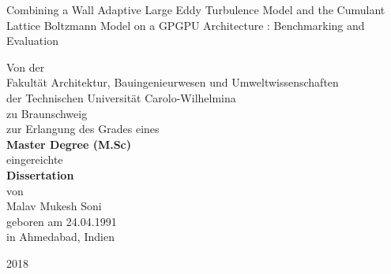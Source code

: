 %
%
\begin{titlepage}
\flushbottom
\renewcommand{\baselinestretch}{1.5} 
\sffamily
  \begin{center}		
    \begin{minipage}{1.5cm}
		\end{minipage}
		\vspace{1mm}
		\Large{Combining a Wall Adaptive Large Eddy Turbulence Model and the Cumulant Lattice Boltzmann Model on a GPGPU 	Architecture : Benchmarking and Evaluation}\\
	 	\vspace{15mm}
    \normalsize
		\begin{minipage}{2cm}
		\end{minipage}
		\begin{minipage}{14cm}
			\begin{center}
				Von der \\
				Fakultät Architektur, Bauingenieurwesen und Umweltwissenschaften \\
				der Technischen Universität Carolo-Wilhelmina \\
				zu Braunschweig \\
				\vspace{15mm}
				zur Erlangung des Grades eines \\
	      \textbf{Master Degree (M.Sc)} \\
	      eingereichte \\
	      \vspace{20mm}
				\textbf{Dissertation}\\
				\vspace{15mm}
				von \\
				Malav Mukesh Soni\\
		    geboren am 24.04.1991 \\
		    in Ahmedabad, Indien \\
	    \end{center}
	  \end{minipage}
	  \vspace{8mm}
  \end{center}
	\hspace{1.4cm}
	{
	}

  \centering
	\vspace{0.7cm}
	2018
\end{titlepage}
